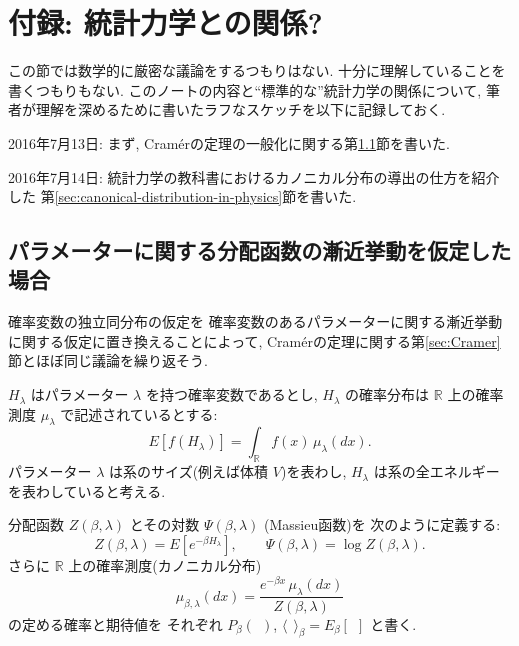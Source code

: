 \documentclass[12pt,twoside]{jarticle}
\newcommand\R{{\mathbb R}} %
\newcommand\bra{\langle}
\newcommand\ket{\rangle}
\theoremstyle{definition} %
\theoremstyle{definition} %
\theoremstyle{definition} %
\numberwithin{theorem}{section}
\numberwithin{equation}{section}
\numberwithin{figure}{section}
\numberwithin{table}{section}
\newcommand\secref[1]{第\ref{#1}節}
\begin{document}

\section{付録: 統計力学との関係?}
\label{sec:statistical-mechanics}

この節では数学的に厳密な議論をするつもりはない.
十分に理解していることを書くつもりもない.
このノートの内容と``標準的な''統計力学の関係について, 
筆者が理解を深めるために書いたラフなスケッチを以下に記録しておく.

2016年7月13日: 
まず, Cram\'erの定理の一般化に関する\secref{sec:generalized-Cramer}を書いた.

2016年7月14日: 
統計力学の教科書におけるカノニカル分布の導出の仕方を紹介した
\secref{sec:canonical-distribution-in-physics}を書いた.


\subsection{パラメーターに関する分配函数の漸近挙動を仮定した場合}
\label{sec:generalized-Cramer}

確率変数の独立同分布の仮定を
確率変数のあるパラメーターに関する漸近挙動に関する仮定に置き換えることによって, 
Cram\'erの定理に関する\secref{sec:Cramer}とほぼ同じ議論を繰り返そう.

$H_\lambda$ はパラメーター $\lambda$ を持つ確率変数であるとし,
$H_\lambda$ の確率分布は $\R$ 上の確率測度 $\mu_\lambda$ で記述されているとする:
\[
E[f(H_\lambda)] = \int_\R f(x)\,\mu_\lambda(dx).
\]
パラメーター $\lambda$ は系のサイズ(例えば体積 $V$)を表わし, 
$H_\lambda$ は系の全エネルギーを表わしていると考える.

分配函数 $Z(\beta,\lambda)$ とその対数 $\Psi(\beta,\lambda)$ (Massieu函数)を
次のように定義する:
\[
Z(\beta,\lambda)=E[e^{-\beta H_\lambda}], \qquad
\Psi(\beta,\lambda)=\log Z(\beta,\lambda).
\]
さらに $\R$ 上の確率測度(カノニカル分布)
\[
\mu_{\beta,\lambda}(dx)=\frac{e^{-\beta x}\,\mu_\lambda(dx)}{Z(\beta,\lambda)}
\]
の定める確率と期待値を
それぞれ $P_\beta(\ \ )$, $\bra\ \ \ket_\beta=E_\beta[\ \ ]$ と書く.
\end{document}
